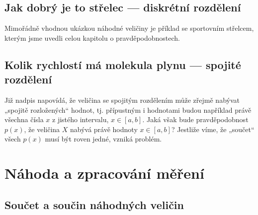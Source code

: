     \subsection{Jak dobrý je to střelec — diskrétní rozdělení}
      Mimořádně vhodnou ukázkou náhodné veličiny je příklad se sportovním střelcem, kterým jsme
      uvedli celou kapitolu o pravděpodobnostech.
  
      
  
    \subsection{Kolik rychlostí má molekula plynu — spojité rozdělení}
      Již nadpis napovídá, že veličina se spojitým rozdělením může zřejmě nabývat „spojitě 
      rozložených“ hodnot, tj. přípustným i hodnotami budou například právě všechna čísla \(x\) z 
      jistého intervalu, \(x\in[a, b]\). Jaká však bude pravděpodobnost \(p(x)\), že veličina \(X\) 
      nabývá právě hodnoty \(x\in[a, b]\)? Jestliže víme, že „součet“ všech \(p(x)\) musí být roven 
      jedné, vzniká problém.
  
  
  
  
  
  
  
  
  
  
  
  
  
  
  
  
  
  
  
  
  
  \section{Náhoda a zpracování měření}
    \subsection{Součet a součin náhodných veličin}
\printbibliography[heading=subbibliography]
